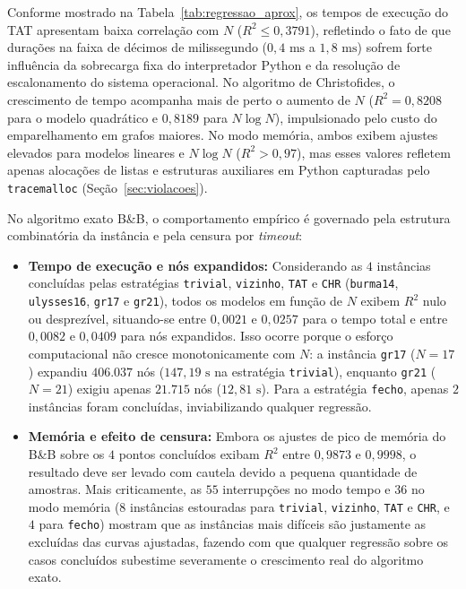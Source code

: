 \documentclass[12pt]{article}
\begin{document}
Conforme mostrado na Tabela~\ref{tab:regressao_aprox}, os tempos de execução do TAT apresentam baixa correlação com $N$ ($R^2 \le 0{,}3791$), refletindo o fato de que durações na faixa de décimos de milissegundo ($0{,}4\text{ ms}$ a $1{,}8\text{ ms}$) sofrem forte influência da sobrecarga fixa do interpretador Python e da resolução de escalonamento do sistema operacional. No algoritmo de Christofides, o crescimento de tempo acompanha mais de perto o aumento de $N$ ($R^2 = 0{,}8208$ para o modelo quadrático e $0{,}8189$ para $N \log N$), impulsionado pelo custo do emparelhamento em grafos maiores. No modo memória, ambos exibem ajustes elevados para modelos lineares e $N \log N$ ($R^2 > 0{,}97$), mas esses valores refletem apenas alocações de listas e estruturas auxiliares em Python capturadas pelo \texttt{tracemalloc} (Seção~\ref{sec:violacoes}).

No algoritmo exato B\&B, o comportamento empírico é governado pela estrutura combinatória da instância e pela censura por \textit{timeout}:
\begin{itemize}
    \item \textbf{Tempo de execução e nós expandidos:} Considerando as $4$ instâncias concluídas pelas estratégias \texttt{trivial}, \texttt{vizinho}, \texttt{TAT} e \texttt{CHR} (\texttt{burma14}, \texttt{ulysses16}, \texttt{gr17} e \texttt{gr21}), todos os modelos em função de $N$ exibem $R^2$ nulo ou desprezível, situando-se entre $0{,}0021$ e $0{,}0257$ para o tempo total e entre $0{,}0082$ e $0{,}0409$ para nós expandidos. Isso ocorre porque o esforço computacional não cresce monotonicamente com $N$: a instância \texttt{gr17} ($N=17$) expandiu $406.037$ nós ($147{,}19\text{ s}$ na estratégia \texttt{trivial}), enquanto \texttt{gr21} ($N=21$) exigiu apenas $21.715$ nós ($12{,}81\text{ s}$). Para a estratégia \texttt{fecho}, apenas $2$ instâncias foram concluídas, inviabilizando qualquer regressão.
    \item \textbf{Memória e efeito de censura:} Embora os ajustes de pico de memória do B\&B sobre os $4$ pontos concluídos exibam $R^2$ entre $0{,}9873$ e $0{,}9998$, o resultado deve ser levado com cautela devido a pequena quantidade de amostras. Mais criticamente, as $55$ interrupções no modo tempo e $36$ no modo memória ($8$ instâncias estouradas para \texttt{trivial}, \texttt{vizinho}, \texttt{TAT} e \texttt{CHR}, e $4$ para \texttt{fecho}) mostram que as instâncias mais difíceis são justamente as excluídas das curvas ajustadas, fazendo com que qualquer regressão sobre os casos concluídos subestime severamente o crescimento real do algoritmo exato.
\end{itemize}
\end{document}
